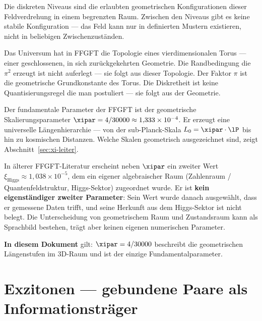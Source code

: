 Die diskreten Niveaus sind die erlaubten geometrischen
Konfigurationen dieser Feldverdrehung in einem begrenzten Raum.
Zwischen den Niveaus gibt es keine stabile Konfiguration ---
das Feld kann nur in definierten Mustern existieren,
nicht in beliebigen Zwischenzuständen.

\begin{foundation}
Das Universum hat in FFGFT die Topologie eines vierdimensionalen Torus ---
einer geschlossenen, in sich zurückgekehrten Geometrie.
Die Randbedingung die $\pi^2$ erzeugt ist nicht auferlegt ---
sie folgt aus dieser Topologie. Der Faktor $\pi$ ist die
geometrische Grundkonstante des Torus. Die Diskretheit ist
keine Quantisierungsregel die man postuliert --- sie folgt
aus der Geometrie.

Der fundamentale Parameter der FFGFT ist der geometrische
Skalierungsparameter $\xipar = 4/30000 \approx 1{,}333 \times 10^{-4}$.
Er erzeugt eine universelle Längenhierarchie --- von der
sub-Planck-Skala $L_0 = \xipar \cdot \lP$ bis hin zu kosmischen Distanzen.
Welche Skalen geometrisch ausgezeichnet sind, zeigt
Abschnitt~\ref{sec:xi-leiter}.

\begin{keypoint}
In älterer FFGFT-Literatur erscheint neben $\xipar$ ein zweiter Wert
$\xi_\text{Higgs} \approx 1{,}038 \times 10^{-5}$, dem ein eigener algebraischer Raum
(Zahlenraum / Quantenfeldstruktur, Higgs-Sektor) zugeordnet wurde.
Er ist \textbf{kein eigenständiger zweiter Parameter}: Sein Wert wurde danach
ausgewählt, dass er gemessene Daten trifft, und seine Herkunft aus dem
Higgs-Sektor ist nicht belegt. Die Unterscheidung von geometrischem Raum
und Zustandsraum kann als Sprachbild bestehen, trägt aber keinen eigenen
numerischen Parameter.

\textbf{In diesem Dokument} gilt: $\xipar = 4/30000$ beschreibt die
geometrischen Längenstufen im 3D-Raum und ist der einzige Fundamentalparameter.
\end{keypoint}
\end{foundation}

\section{Exzitonen --- gebundene Paare als Informationsträger}
\label{sec:exzitonen}


